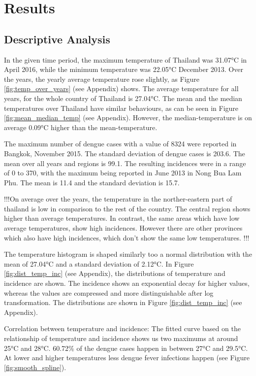 \section{Results}
	\subsection{Descriptive Analysis}
In the given time period, the maximum temperature of Thailand was 31.07°C in April 2016, while the minimum temperature was 22.05°C December 2013. Over the years, the yearly average temperature rose slightly, as Figure \ref{fig:temp_over_years} (see Appendix) shows. The average temperature for all years, for the whole country of Thailand is 27.04°C.
The mean and the median temperatures over Thailand have similar behaviours, as can be seen in Figure \ref{fig:mean_median_temp} (see Appendix). However, the median-temperature is on average 0.09°C higher than the mean-temperature.

The maximum number of dengue cases with a value of 8324 were reported in Bangkok, November 2015. The standard deviation of dengue cases is 203.6. The mean over all years and regions is 99.1.
The resulting incidences were in a range of 0 to 370, with the maximum being reported in June 2013 in Nong Bua Lam Phu. The mean is 11.4 and the standard deviation is 15.7.

!!!On average over the years, the temperature in the norther-eastern part of thailand is low in comparison to the rest of the country. The central region shows higher than average temperatures. 
In contrast, the same areas which have low average temperatures, show high incidences. However there are other provinces which also have high incidences, which don’t show the same low temperatures. !!!


The temperature histogram is shaped similarly too a normal distribution with the mean of 27.04°C and a standard deviation of 2.12°C. In Figure \ref{fig:dist_temp_inc} (see Appendix), the distributions of temperature and incidence are shown.
The incidence shows an exponential decay for higher values, whereas the values are compressed and more distinguishable after log transformation. The distributions are shown in Figure \ref{fig:dist_temp_inc} (see Appendix). 

Correlation between temperature and incidence:
The fitted curve based on the relationship of temperature and incidence shows us two maximums at around 25°C and 28°C. 60.72\% of the dengue cases happen in between 27°C and 29.5°C. At lower and higher temperatures less dengue fever infections happen (see Figure \ref{fig:smooth_spline}).


